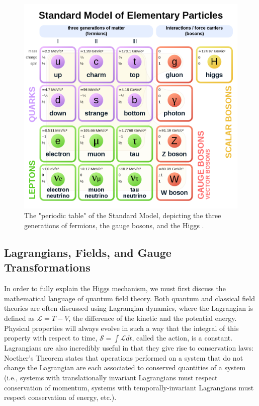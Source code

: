 \begin{figure}
\includegraphics[width=\linewidth]{figures/theory_chapter/SM.png}
\caption{The "periodic table" of the Standard Model, depicting the three generations of fermions, the gauge bosons, and the Higgs \cite{WikipediaSM}.}
\end{figure}

\subsection{Lagrangians, Fields, and Gauge Transformations}\label{sec:Lagrangians}

In order to fully explain the Higgs mechanism, we must first discuss the mathematical language of quantum field theory. Both quantum and classical field theories are often discussed using Lagrangian dynamics, where the Lagrangian is defined as  $\mathcal{L} = T - V$, the difference of the kinetic and the potential energy. Physical properties will always evolve in such a way that the integral of this property with respect to time, $\mathcal{S} = \int \mathcal{L} dt$, called the action, is a constant. Lagrangians are also incredibly useful in that they give rise to conservation laws: Noether's Theorem states that operations performed on a system that do not change the Lagrangian are each associated to conserved quantities of a system (i.e., systems with translationally invariant Lagrangians must respect conservation of momentum, systems with temporally-invariant Lagrangians must respect conservation of energy, etc.).

